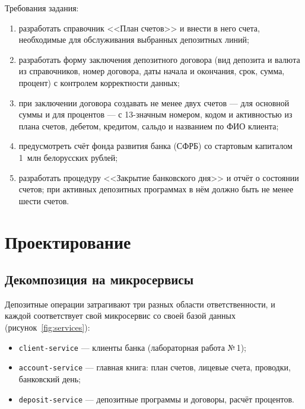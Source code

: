 \documentclass[14pt,a4paper]{extarticle}
\begin{document}
Требования задания:
\begin{enumerate}
\item разработать справочник <<План счетов>> и внести в него счета, необходимые для
обслуживания выбранных депозитных линий;
\item разработать форму заключения депозитного договора (вид депозита и валюта из
справочников, номер договора, даты начала и окончания, срок, сумма, процент) с контролем
корректности данных;
\item при заключении договора создавать не менее двух счетов --- для основной суммы и
для процентов --- с 13-значным номером, кодом и активностью из плана счетов, дебетом,
кредитом, сальдо и названием по ФИО клиента;
\item предусмотреть счёт фонда развития банка (СФРБ) со стартовым капиталом 1~млн
белорусских рублей;
\item разработать процедуру <<Закрытие банковского дня>> и отчёт о состоянии счетов; при
активных депозитных программах в нём должно быть не менее шести счетов.
\end{enumerate}

\section{Проектирование}

\subsection{Декомпозиция на микросервисы}

Депозитные операции затрагивают три разных области ответственности, и каждой
соответствует свой микросервис со своей базой данных (рисунок~\ref{fig:services}):
\begin{itemize}
\item \texttt{client-service} --- клиенты банка (лабораторная работа №\,1);
\item \texttt{account-service} --- главная книга: план счетов, лицевые счета, проводки,
банковский день;
\item \texttt{deposit-service} --- депозитные программы и договоры, расчёт процентов.
\end{itemize}
\end{document}
